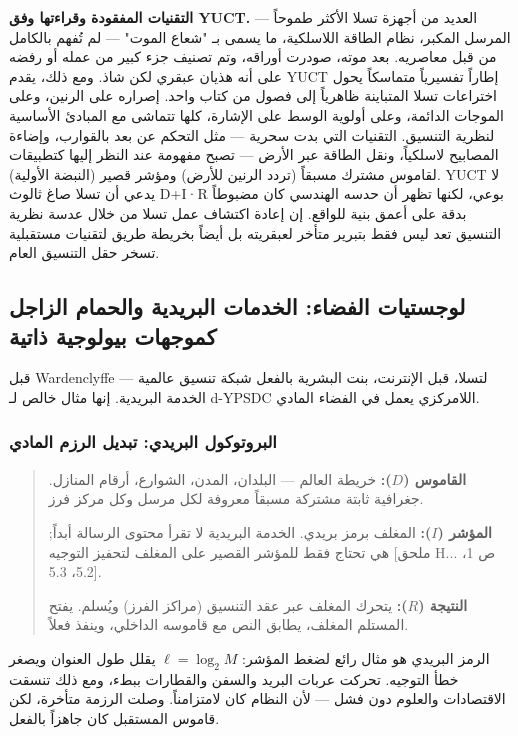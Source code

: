\documentclass[12pt,a4paper]{article}
\begin{document}
	\textbf{التقنيات المفقودة وقراءتها وفق YUCT.} العديد من أجهزة تسلا الأكثر طموحاً — المرسل المكبر، نظام الطاقة اللاسلكية، ما يسمى بـ "شعاع الموت" — لم تُفهم بالكامل من قبل معاصريه. بعد موته، صودرت أوراقه، وتم تصنيف جزء كبير من عمله أو رفضه على أنه هذيان عبقري لكن شاذ. ومع ذلك، يقدم YUCT إطاراً تفسيرياً متماسكاً يحول اختراعات تسلا المتباينة ظاهرياً إلى فصول من كتاب واحد. إصراره على الرنين، وعلى الموجات الدائمة، وعلى أولوية الوسط على الإشارة، كلها تتماشى مع المبادئ الأساسية لنظرية التنسيق. التقنيات التي بدت سحرية — مثل التحكم عن بعد بالقوارب، وإضاءة المصابيح لاسلكياً، ونقل الطاقة عبر الأرض — تصبح مفهومة عند النظر إليها كتطبيقات لقاموس مشترك مسبقاً (تردد الرنين للأرض) ومؤشر قصير (النبضة الأولية). YUCT لا يدعي أن تسلا صاغ ثالوث D+I·R بوعي، لكنها تظهر أن حدسه الهندسي كان مضبوطاً بدقة على أعمق بنية للواقع. إن إعادة اكتشاف عمل تسلا من خلال عدسة نظرية التنسيق تعد ليس فقط بتبرير متأخر لعبقريته بل أيضاً بخريطة طريق لتقنيات مستقبلية تسخر حقل التنسيق العام.
	
	\subsection{لوجستيات الفضاء: الخدمات البريدية والحمام الزاجل كموجهات بيولوجية ذاتية}
	\label{subsec:postal-pigeons}
	
	قبل Wardenclyffe لتسلا، قبل الإنترنت، بنت البشرية بالفعل شبكة تنسيق عالمية — الخدمة البريدية. إنها مثال خالص لـ d-YPSDC اللامركزي يعمل في الفضاء المادي.
	
	\subsubsection{البروتوكول البريدي: تبديل الرزم المادي}
	
	\begin{quote}
		\textbf{القاموس (\(D\)):} خريطة العالم — البلدان، المدن، الشوارع، أرقام المنازل. جغرافية ثابتة مشتركة مسبقاً معروفة لكل مرسل وكل مركز فرز.
		
		\textbf{المؤشر (\(I\)):} المغلف برمز بريدي. الخدمة البريدية لا تقرأ محتوى الرسالة أبداً; هي تحتاج فقط للمؤشر القصير على المغلف لتحفيز التوجيه [ملحق H... ص 1، 5.2، 5.3].
		
		\textbf{النتيجة (\(R\)):} يتحرك المغلف عبر عقد التنسيق (مراكز الفرز) ويُسلم. يفتح المستلم المغلف، يطابق النص مع قاموسه الداخلي، وينفذ فعلاً.
	\end{quote}
	
	الرمز البريدي هو مثال رائع لضغط المؤشر: \( \ell = \log_2 M \) يقلل طول العنوان ويصغر خطأ التوجيه. تحركت عربات البريد والسفن والقطارات ببطء، ومع ذلك تنسقت الاقتصادات والعلوم دون فشل — لأن النظام كان لامتزامناً. وصلت الرزمة متأخرة، لكن قاموس المستقبل كان جاهزاً بالفعل.
	
\end{document}
